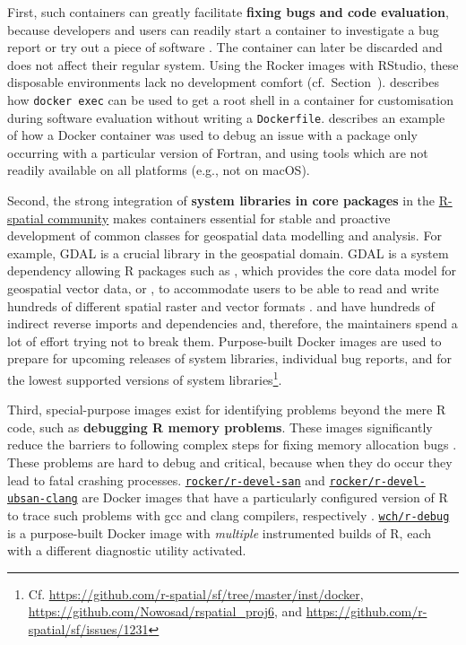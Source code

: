 First, such containers can greatly facilitate \textbf{fixing bugs and
code evaluation}, because developers and users can readily start a
container to investigate a bug report or try out a piece of software
\citep[cf.][]{ooms_opencpu_2017}. The container can later be discarded
and does not affect their regular system. Using the Rocker images with
RStudio, these disposable environments lack no development comfort
(cf.~Section~). \citet{ooms_opencpu_2017} describes
how \texttt{docker\ exec} can be used to get a root shell in a container
for customisation during software evaluation without writing a
\texttt{Dockerfile}. \citet{eddelbuettel_debugging_2019} describes an
example of how a Docker container was used to debug an issue with a
package only occurring with a particular version of Fortran, and using
tools which are not readily available on all platforms (e.g., not on
macOS).

Second, the strong integration of \textbf{system libraries in core
packages} in the \href{https://www.r-spatial.org/}{R-spatial community}
makes containers essential for stable and proactive development of
common classes for geospatial data modelling and analysis. For example,
GDAL \citep{gdal_2019} is a crucial library in the geospatial domain.
GDAL is a system dependency allowing R packages such as ,
which provides the core data model for geospatial vector data, or
, to accommodate users to be able to read and write
hundreds of different spatial raster and vector formats
\citep{pebesma_simple_2018,cran_rgdal}.  and  have
hundreds of indirect reverse imports and dependencies and, therefore,
the maintainers spend a lot of effort trying not to break them.
Purpose-built Docker images are used to prepare for upcoming releases of
system libraries, individual bug reports, and for the lowest supported
versions of system
libraries\footnote{Cf. \href{https://github.com/r-spatial/sf/tree/master/inst/docker}{https://github.com/r-spatial/sf/tree/master/inst/docker}, \href{https://github.com/Nowosad/rspatial_proj6}{https://github.com/Nowosad/rspatial\_proj6}, and \href{https://github.com/r-spatial/sf/issues/1231}{https://github.com/r-spatial/sf/issues/1231}}.

Third, special-purpose images exist for identifying problems beyond the
mere R code, such as \textbf{debugging R memory problems}. These images
significantly reduce the barriers to following complex steps for fixing
memory allocation bugs \citep[cf. Section~4.3 in][]{core_writing_1999}.
These problems are hard to debug and critical, because when they do
occur they lead to fatal crashing processes.
\href{https://github.com/rocker-org/r-devel-san}{\texttt{rocker/r-devel-san}}
and
\href{https://github.com/rocker-org/r-devel-san-clang}{\texttt{rocker/r-devel-ubsan-clang}}
are Docker images that have a particularly configured version of R to
trace such problems with gcc and clang compilers, respectively
\citep[cf.~ for examples,][]{eddelbuettel_sanitizers_2014}.
\href{https://github.com/wch/r-debug}{\texttt{wch/r-debug}} is a
purpose-built Docker image with \emph{multiple} instrumented builds of
R, each with a different diagnostic utility activated.

